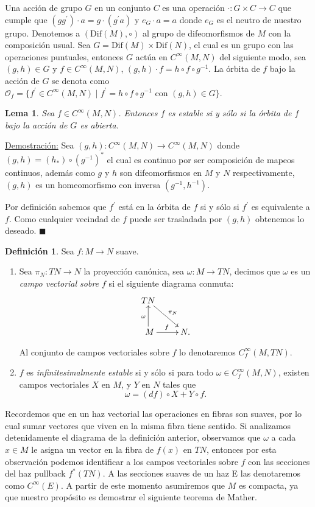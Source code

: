 \documentclass{report}
\newtheorem{lem}[theorem]{Lema}
\theoremstyle{definition}
\newtheorem{defi}[theorem]{Definici\'on}
\begin{document}
Una acci\'on de grupo $G$ en un conjunto $C$ es una operaci\'on $\cdot: G \times C \to C$ que cumple que $(g g^\prime) \cdot a = g \cdot (g^\prime a)$ y $e_G \cdot a = a$ donde $e_G$ es el neutro de nuestro grupo. Denotemos a $(\text{Dif}(M), \circ)$ al grupo de difeomorfismos de $M$ con la composici\'on usual. Sea $G = \text{Dif}(M) \times  \text{Dif}(N)$, el cual es un grupo con las operaciones puntuales, entonces $G$ act\'ua en $C^\infty (M,N)$  del siguiente modo, sea $(g,h) \in G$ y $f \in C^\infty(M,N)$, $(g,h) \cdot f = h \circ f \circ g^{-1}$. La \'orbita de $f$ bajo la acci\'on de $G$ se denota como $\mathcal{O}_f = \{ f^\prime \in C^\infty (M,N) \mid f^\prime = h \circ f \circ g^{-1} \text{ con } (g,h) \in G \}$.

\begin{lem}
Sea $f \in C^\infty (M,N)$. Entonces $f$ es estable si y s\'olo si la \'orbita de $f$ bajo la acci\'on de $G$ es abierta.
\end{lem}
\underline{Demostraci\'on:} Sea $(g,h): C^\infty (M,N) \to C^\infty (M,N)$ donde $(g,h) = (h_\ast) \circ (g^{-1})^\ast $ el cual es continuo por ser composici\'on de mapeos continuos, adem\'as como $g$ y $h$ son difeomorfismos en $M$ y $N$ respectivamente, $(g,h)$ es un homeomorfismo con inversa $(g^{-1} , h^{-1})$.

Por definici\'on sabemos que $f^\prime$ est\'a en la \'orbita de $f$ si y s\'olo si $f^\prime$ es equivalente a $f$. Como cualquier vecindad de $f$ puede ser trasladada por $(g,h)$ obtenemos lo deseado. $\blacksquare$

\begin{defi}
Sea $f: M \to N$ suave.
\begin{enumerate}
\item Sea $\pi_N : TN \to N$ la proyecci\'on can\'onica, sea $\omega: M \to TN$, decimos que $\omega$ es un \textit{campo vectorial sobre $f$} si el siguiente diagrama conmuta:
$$ \xymatrix{
TN \ar[dr]^{\pi_N}\\\
M \ar[u]^\omega \ar[r]^f &N.} $$

Al conjunto de campos vectoriales sobre $f$ lo denotaremos $C^\infty_f (M, TN)$.
\item $f$ es \textit{infinitesimalmente estable} si y s\'olo si para todo $\omega \in C^\infty_f(M,N)$, existen campos vectoriales $X$ en $M$, y $Y$ en $N$ tales que $$\omega = (df) \circ X + Y \circ f .$$
\end{enumerate}
\end{defi}
Recordemos que en un haz vectorial las operaciones en fibras son suaves, por lo cual sumar vectores que viven en la misma fibra tiene sentido. Si analizamos detenidamente el diagrama de la definici\'on anterior, observamos que $\omega$ a cada $x \in M$ le asigna un vector en la fibra de $f(x)$ en $TN$, entonces por esta observaci\'on podemos identificar a los campos vectoriales sobre $f$ con las secciones del haz pullback $f^\ast (TN)$. A las secciones suaves de un haz E las denotaremos como $C^\infty (E)$. A partir de este momento asumiremos que $M$ es compacta, ya que nuestro prop\'osito es demostrar el siguiente teorema de Mather.
\end{document}
